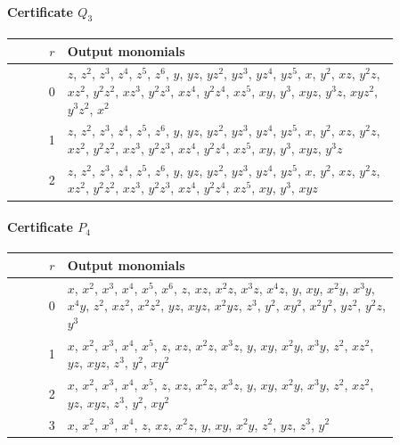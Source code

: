 \documentclass[11pt]{amsart}
\theoremstyle{definition}
\theoremstyle{remark}
\numberwithin{equation}{section}
\begin{document}
\paragraph*{Certificate $Q_3$}
\begin{center}
\begin{tabular}{rp{0.86\linewidth}}
$r$ & Output monomials\\\hline
0 & \(z\), \(z^{2}\), \(z^{3}\), \(z^{4}\), \(z^{5}\), \(z^{6}\), \(y\), \(yz\), \(yz^{2}\), \(yz^{3}\), \(yz^{4}\), \(yz^{5}\), \(x\), \(y^{2}\), \(xz\), \(y^{2}z\), \(xz^{2}\), \(y^{2}z^{2}\), \(xz^{3}\), \(y^{2}z^{3}\), \(xz^{4}\), \(y^{2}z^{4}\), \(xz^{5}\), \(xy\), \(y^{3}\), \(xyz\), \(y^{3}z\), \(xyz^{2}\), \(y^{3}z^{2}\), \(x^{2}\)\\
1 & \(z\), \(z^{2}\), \(z^{3}\), \(z^{4}\), \(z^{5}\), \(z^{6}\), \(y\), \(yz\), \(yz^{2}\), \(yz^{3}\), \(yz^{4}\), \(yz^{5}\), \(x\), \(y^{2}\), \(xz\), \(y^{2}z\), \(xz^{2}\), \(y^{2}z^{2}\), \(xz^{3}\), \(y^{2}z^{3}\), \(xz^{4}\), \(y^{2}z^{4}\), \(xz^{5}\), \(xy\), \(y^{3}\), \(xyz\), \(y^{3}z\)\\
2 & \(z\), \(z^{2}\), \(z^{3}\), \(z^{4}\), \(z^{5}\), \(z^{6}\), \(y\), \(yz\), \(yz^{2}\), \(yz^{3}\), \(yz^{4}\), \(yz^{5}\), \(x\), \(y^{2}\), \(xz\), \(y^{2}z\), \(xz^{2}\), \(y^{2}z^{2}\), \(xz^{3}\), \(y^{2}z^{3}\), \(xz^{4}\), \(y^{2}z^{4}\), \(xz^{5}\), \(xy\), \(y^{3}\), \(xyz\)\\
\end{tabular}
\end{center}

\paragraph*{Certificate $P_4$}
\begin{center}
\begin{tabular}{rp{0.86\linewidth}}
$r$ & Output monomials\\\hline
0 & \(x\), \(x^{2}\), \(x^{3}\), \(x^{4}\), \(x^{5}\), \(x^{6}\), \(z\), \(xz\), \(x^{2}z\), \(x^{3}z\), \(x^{4}z\), \(y\), \(xy\), \(x^{2}y\), \(x^{3}y\), \(x^{4}y\), \(z^{2}\), \(xz^{2}\), \(x^{2}z^{2}\), \(yz\), \(xyz\), \(x^{2}yz\), \(z^{3}\), \(y^{2}\), \(xy^{2}\), \(x^{2}y^{2}\), \(yz^{2}\), \(y^{2}z\), \(y^{3}\)\\
1 & \(x\), \(x^{2}\), \(x^{3}\), \(x^{4}\), \(x^{5}\), \(z\), \(xz\), \(x^{2}z\), \(x^{3}z\), \(y\), \(xy\), \(x^{2}y\), \(x^{3}y\), \(z^{2}\), \(xz^{2}\), \(yz\), \(xyz\), \(z^{3}\), \(y^{2}\), \(xy^{2}\)\\
2 & \(x\), \(x^{2}\), \(x^{3}\), \(x^{4}\), \(x^{5}\), \(z\), \(xz\), \(x^{2}z\), \(x^{3}z\), \(y\), \(xy\), \(x^{2}y\), \(x^{3}y\), \(z^{2}\), \(xz^{2}\), \(yz\), \(xyz\), \(z^{3}\), \(y^{2}\), \(xy^{2}\)\\
3 & \(x\), \(x^{2}\), \(x^{3}\), \(x^{4}\), \(z\), \(xz\), \(x^{2}z\), \(y\), \(xy\), \(x^{2}y\), \(z^{2}\), \(yz\), \(z^{3}\), \(y^{2}\)\\
\end{tabular}
\end{center}
\end{document}

